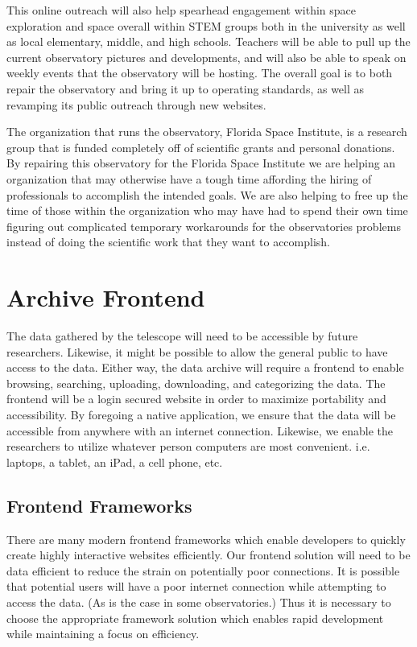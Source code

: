 \documentclass[12pt]{report}
\begin{document}
This online outreach will also help spearhead engagement within space exploration and space overall within STEM groups both in the university as well as local elementary, middle, and high schools. Teachers will be able to pull up the current observatory pictures and developments, and will also be able to speak on weekly events that the observatory will be hosting. The overall goal is to both repair the observatory and bring it up to operating standards, as well as revamping its public outreach through new websites.

The organization that runs the observatory, Florida Space Institute, is a research group that is funded completely off of scientific grants and personal donations. By repairing this observatory for the Florida Space Institute we are helping an organization that may otherwise have a tough time affording the hiring of professionals to accomplish the intended goals. We are also helping to free up the time of those within the organization who may have had to spend their own time figuring out complicated temporary workarounds for the observatories problems instead of doing the scientific work that they want to accomplish.

\section*{Archive Frontend}

The data gathered by the telescope will need to be accessible by future researchers. Likewise, it might be possible to allow the general public to have access to the data. Either way, the data archive will require a frontend to enable browsing, searching, uploading, downloading, and categorizing the data. The frontend will be a login secured website in order to maximize portability and accessibility. By foregoing a native application, we ensure that the data will be accessible from anywhere with an internet connection. Likewise, we enable the researchers to utilize whatever person computers are most convenient. i.e. laptops, a tablet, an iPad, a cell phone, etc.

\subsection*{Frontend Frameworks}

There are many modern frontend frameworks which enable developers to quickly create highly interactive websites efficiently. Our frontend solution will need to be data efficient to reduce the strain on potentially poor connections. It is possible that potential users will have a poor internet connection while attempting to access the data. (As is the case in some observatories.) Thus it is necessary to choose the appropriate framework solution which enables rapid development while maintaining a focus on efficiency.
\end{document}
